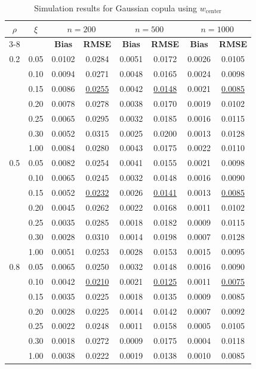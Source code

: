 \documentclass[twoside]{article}
\begin{document}
\begin{table}[!t]
\centering
\small
\setlength{\tabcolsep}{4pt}
\caption{Simulation results for Gaussian copula using $w_{\text{center}}$}
\label{tab:gaussian}
\begin{tabular}{c c @{\hspace{1.5em}} c c @{\hspace{1.5em}} c c @{\hspace{1.5em}} c c}
\hline
\multicolumn{1}{c}{\textbf{$\rho$}} & \multicolumn{1}{c}{\textbf{$\xi$}} & \multicolumn{2}{c}{\textbf{$n=200$}} & \multicolumn{2}{c}{\textbf{$n=500$}} & \multicolumn{2}{c}{\textbf{$n=1000$}} \\
\cline{3-8}
 & & \textbf{Bias} & \textbf{RMSE} & \textbf{Bias} & \textbf{RMSE} & \textbf{Bias} & \textbf{RMSE} \\
\hline
0.2 & 0.05 & 0.0102 & 0.0284 & 0.0051 & 0.0172 & 0.0026 & 0.0105 \\
 & 0.10 & 0.0094 & 0.0271 & 0.0048 & 0.0165 & 0.0024 & 0.0098 \\
 & 0.15 & 0.0086 & \underline{0.0255} & 0.0042 & \underline{0.0148} & 0.0021 & \underline{0.0085} \\
 & 0.20 & 0.0078 & 0.0278 & 0.0038 & 0.0170 & 0.0019 & 0.0102 \\
 & 0.25 & 0.0065 & 0.0295 & 0.0032 & 0.0185 & 0.0016 & 0.0115 \\
 & 0.30 & 0.0052 & 0.0315 & 0.0025 & 0.0200 & 0.0013 & 0.0128 \\
 & 1.00 & 0.0084 & 0.0280 & 0.0043 & 0.0175 & 0.0022 & 0.0110 \\
\hline
0.5 & 0.05 & 0.0082 & 0.0254 & 0.0041 & 0.0155 & 0.0021 & 0.0098 \\
 & 0.10 & 0.0065 & 0.0245 & 0.0032 & 0.0148 & 0.0016 & 0.0090 \\
 & 0.15 & 0.0052 & \underline{0.0232} & 0.0026 & \underline{0.0141} & 0.0013 & \underline{0.0085} \\
 & 0.20 & 0.0045 & 0.0262 & 0.0022 & 0.0168 & 0.0011 & 0.0102 \\
 & 0.25 & 0.0035 & 0.0285 & 0.0018 & 0.0182 & 0.0009 & 0.0115 \\
 & 0.30 & 0.0028 & 0.0310 & 0.0014 & 0.0198 & 0.0007 & 0.0128 \\
 & 1.00 & 0.0051 & 0.0253 & 0.0028 & 0.0153 & 0.0015 & 0.0095 \\
\hline
0.8 & 0.05 & 0.0065 & 0.0250 & 0.0032 & 0.0148 & 0.0016 & 0.0090 \\
 & 0.10 & 0.0042 & \underline{0.0210} & 0.0021 & \underline{0.0125} & 0.0011 & \underline{0.0075} \\
 & 0.15 & 0.0035 & 0.0225 & 0.0018 & 0.0135 & 0.0009 & 0.0085 \\
 & 0.20 & 0.0028 & 0.0225 & 0.0014 & 0.0142 & 0.0007 & 0.0092 \\
 & 0.25 & 0.0022 & 0.0248 & 0.0011 & 0.0158 & 0.0005 & 0.0105 \\
 & 0.30 & 0.0018 & 0.0272 & 0.0009 & 0.0175 & 0.0004 & 0.0118 \\
 & 1.00 & 0.0038 & 0.0222 & 0.0019 & 0.0138 & 0.0010 & 0.0085 \\
\hline
\end{tabular}
\end{table}
\end{document}
